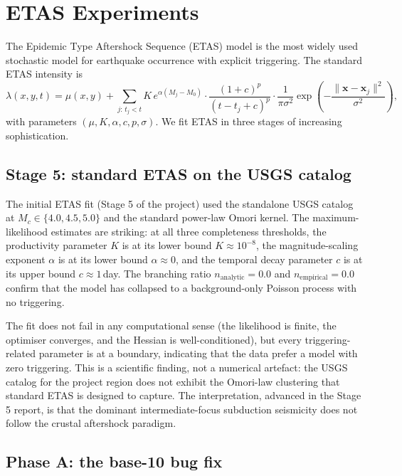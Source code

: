 \documentclass[10pt,a4paper,twocolumn]{article}
\begin{document}
\section{ETAS Experiments}\label{sec:etas-experiments}

The Epidemic Type Aftershock Sequence (ETAS) model \cite{ogata1988} is the most widely used stochastic model for earthquake occurrence with explicit triggering. The standard ETAS intensity is
\[
\lambda(x,y,t) = \mu(x,y) + \sum_{j:\,t_j<t} K\, e^{\alpha(M_j - M_0)} \cdot \frac{(1+c)^p}{(t - t_j + c)^p} \cdot \frac{1}{\pi\sigma^2} \exp\!\left(-\frac{\|\mathbf{x} - \mathbf{x}_j\|^2}{\sigma^2}\right),
\]
with parameters $(\mu, K, \alpha, c, p, \sigma)$. We fit ETAS in three stages of increasing sophistication.

\subsection{Stage 5: standard ETAS on the USGS catalog}

The initial ETAS fit (Stage 5 of the project) used the standalone USGS catalog at $M_c\in\{4.0, 4.5, 5.0\}$ and the standard power-law Omori kernel. The maximum-likelihood estimates are striking: at all three completeness thresholds, the productivity parameter $K$ is at its lower bound $K\approx 10^{-8}$, the magnitude-scaling exponent $\alpha$ is at its lower bound $\alpha\approx0$, and the temporal decay parameter $c$ is at its upper bound $c\approx1$\,day. The branching ratio $n_{\text{analytic}} = 0.0$ and $n_{\text{empirical}} = 0.0$ confirm that the model has collapsed to a background-only Poisson process with no triggering.

The fit does not fail in any computational sense (the likelihood is finite, the optimiser converges, and the Hessian is well-conditioned), but every triggering-related parameter is at a boundary, indicating that the data prefer a model with zero triggering. This is a scientific finding, not a numerical artefact: the USGS catalog for the project region does not exhibit the Omori-law clustering that standard ETAS is designed to capture. The interpretation, advanced in the Stage 5 report, is that the dominant intermediate-focus subduction seismicity does not follow the crustal aftershock paradigm.

\subsection{Phase A: the base-10 bug fix}
\end{document}
